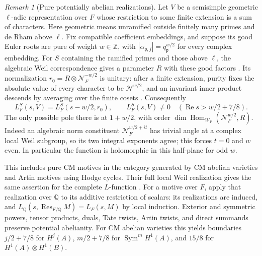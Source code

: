 \documentclass[11pt,a4paper]{article}
\numberwithin{equation}{section}
\theoremstyle{definition}
\theoremstyle{remark}
\newtheorem{remark}[theorem]{Remark}
\newcommand{\ZZ}{\mathbb Z}
\newcommand{\QQ}{\mathbb Q}
\newcommand{\Rea}{\operatorname{Re}}
\begin{document}
\begin{remark}[Pure potentially abelian realizations]\label{cor:potentially-abelian}\label{subsec:CM}\label{cor:CM}
Let $V$ be a semisimple geometric $\ell$-adic representation over $F$
whose restriction to some finite extension is a sum of characters.
Here geometric means unramified outside finitely many primes and de
Rham above $\ell$. Fix compatible coefficient embeddings, and suppose
its good Euler roots are pure of weight $w\in\ZZ$, with
$|\alpha_{\mathfrak p,j}|=q_{\mathfrak p}^{w/2}$ for every complex
embedding. For $S$ containing the ramified primes and those above
$\ell$, the algebraic Weil correspondence gives a parameter $R$ with
these good factors \cite[Theorem~9 and Corollary~10]{Johansson}.
Its normalization $r_0=R\otimes\mathcal N_F^{-w/2}$ is unitary: after
a finite extension, purity fixes the absolute value of every character
to be $\mathcal N^{w/2}$, and an invariant inner product descends by
averaging over the finite cosets \cite[Lemma~14(1)]{Johansson}.
Consequently
\begin{equation}\label{eq:geometric-L-shift}
 L_F^S(s,V)=L_F^S(s-w/2,r_0),\qquad
 L_F^S(s,V)\ne0\quad(\Rea s>w/2+7/8).
\end{equation}
The only possible pole there is at $1+w/2$, with order
$\dim\operatorname{Hom}_{W_F}(\mathcal N_F^{w/2},R)$.
Indeed an algebraic norm constituent $\mathcal N_F^{w/2+it}$ has
trivial angle at a complex local Weil subgroup, so its two integral
exponents agree; this forces $t=0$ and $w$ even. In particular the
function is holomorphic in this half-plane for odd $w$.

This includes pure CM motives in the category generated by CM abelian
varieties and Artin motives using Hodge cycles. Their full local Weil
realization gives the same assertion for the complete $L$-function
\cite[Corollaries~7.6, 7.9 and Proposition~7.12]{Fargues}.
For a motive over $F$, apply that realization over $\QQ$ to its additive
restriction of scalars: its realizations are induced, and
$L_{\QQ}(s,\operatorname{Res}_{F/\QQ}M)=L_F(s,M)$ by local induction.
Exterior and symmetric powers, tensor products, duals, Tate twists,
Artin twists, and direct summands preserve potential abelianity.
For CM abelian varieties this yields boundaries $j/2+7/8$ for
$H^j(A)$, $m/2+7/8$ for $\operatorname{Sym}^mH^1(A)$, and $15/8$
for $H^1(A)\otimes H^1(B)$.
\end{remark}
\end{document}
